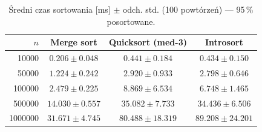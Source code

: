 \begin{table}[H]
\centering
\caption{Średni czas sortowania [ms] $\pm$ odch. std. (100 powtórzeń) — 95\,\% posortowane.}
\label{tab:summary_sorted_95}
\begin{tabular}{rccc}
\toprule
$n$ & Merge sort & Quicksort (med-3) & Introsort \\
\midrule
\num{10000} & $0.206 \pm 0.048$ & $0.441 \pm 0.184$ & $0.434 \pm 0.150$ \\
\num{50000} & $1.224 \pm 0.242$ & $2.920 \pm 0.933$ & $2.798 \pm 0.646$ \\
\num{100000} & $2.479 \pm 0.225$ & $8.869 \pm 6.534$ & $6.748 \pm 1.465$ \\
\num{500000} & $14.030 \pm 0.557$ & $35.082 \pm 7.733$ & $34.436 \pm 6.506$ \\
\num{1000000} & $31.671 \pm 4.745$ & $80.488 \pm 18.319$ & $89.208 \pm 24.201$ \\
\bottomrule
\end{tabular}
\end{table}
